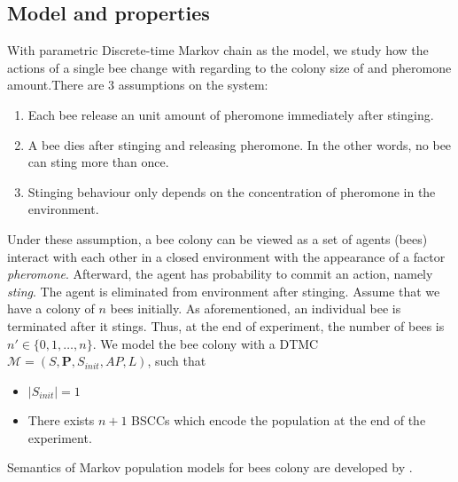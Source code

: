 \subsection{Model and properties}
With parametric Discrete-time Markov chain as the model, we study how the actions of a single bee
change with regarding to the colony size of and pheromone amount.There are 3 assumptions on the
system:
\begin{enumerate}
    \item Each bee release an unit amount of pheromone immediately after stinging.
    \item A bee dies after stinging and releasing pheromone. In the other words, no bee can sting
          more than once.
    \item Stinging behaviour only depends on the concentration of pheromone in the environment.
\end{enumerate}
Under these assumption, a bee colony can be viewed as a set of agents (bees) interact with each
other in a closed environment with the appearance of a factor \textit{pheromone}. Afterward, the
agent has probability to commit an action, namely \textit{sting}. The agent is eliminated from
environment after stinging. Assume that we have a colony of $n$ bees initially. As aforementioned,
an individual bee is terminated after it stings. Thus, at the end of experiment, the number of bees
is $n'\in\{0,1,\ldots,n\}$. We model the bee colony with a DTMC $\mathcal{M}=(S,\mathbf{P},
    S_{init}, AP,L)$, such that
\begin{itemize}
    \item $|S_{init}|=1$
    \item There exists $n+1$ BSCCs which encode the population at the end of the experiment.
\end{itemize}
Semantics of Markov population models for bees colony are developed by \cite{hajnal2019data}.
